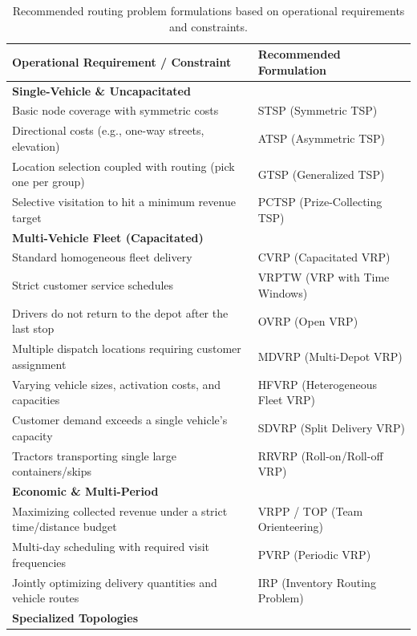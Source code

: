 \documentclass{article}
\begin{document}
\begin{table}[H]
    \centering
    \caption{Recommended routing problem formulations based on operational requirements and constraints.}
    \begin{tabularx}{\textwidth}{@{} X l @{}}
        \toprule
        \textbf{Operational Requirement / Constraint} & \textbf{Recommended Formulation} \\
        \midrule
        \textbf{Single-Vehicle \& Uncapacitated} \\
        Basic node coverage with symmetric costs & STSP (Symmetric TSP) \\
        Directional costs (e.g., one-way streets, elevation) & ATSP (Asymmetric TSP) \\
        Location selection coupled with routing (pick one per group) & GTSP (Generalized TSP) \\
        Selective visitation to hit a minimum revenue target & PCTSP (Prize-Collecting TSP) \\
        \midrule
        \textbf{Multi-Vehicle Fleet (Capacitated)} \\
        Standard homogeneous fleet delivery & CVRP (Capacitated VRP) \\
        Strict customer service schedules & VRPTW (VRP with Time Windows) \\
        Drivers do not return to the depot after the last stop & OVRP (Open VRP) \\
        Multiple dispatch locations requiring customer assignment & MDVRP (Multi-Depot VRP) \\
        Varying vehicle sizes, activation costs, and capacities & HFVRP (Heterogeneous Fleet VRP) \\
        Customer demand exceeds a single vehicle's capacity & SDVRP (Split Delivery VRP) \\
        Tractors transporting single large containers/skips & RRVRP (Roll-on/Roll-off VRP) \\
        \midrule
        \textbf{Economic \& Multi-Period} \\
        Maximizing collected revenue under a strict time/distance budget & VRPP / TOP (Team Orienteering) \\
        Multi-day scheduling with required visit frequencies & PVRP (Periodic VRP) \\
        Jointly optimizing delivery quantities and vehicle routes & IRP (Inventory Routing Problem) \\
        \midrule
        \textbf{Specialized Topologies} \\

\end{tabularx}
\end{table}
\end{document}
